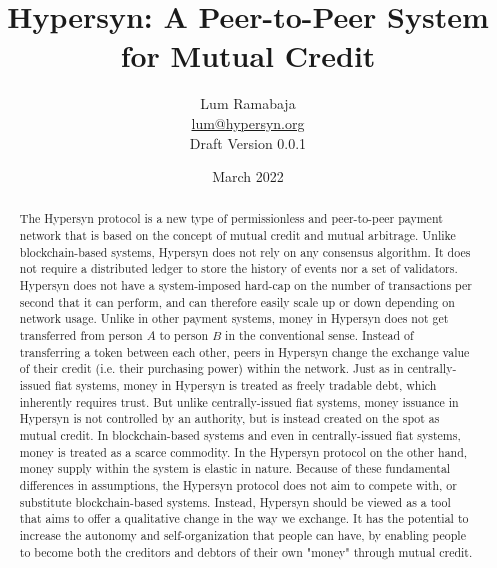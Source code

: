 \documentclass{article}
\title{Hypersyn: A Peer-to-Peer System for Mutual Credit}
\author{Lum Ramabaja \\ \href{mailto:lum@hypersyn.org}{lum@hypersyn.org} \\ Draft Version 0.0.1 }%
\date{March 2022}
\begin{document}
\maketitle

\begin{abstract}
    The Hypersyn protocol is a new type of permissionless and peer-to-peer payment network that is based on the concept of mutual credit and mutual arbitrage. Unlike blockchain-based systems, Hypersyn does not rely on any consensus algorithm. It does not require a distributed ledger to store the history of events nor a set of validators. Hypersyn does not have a system-imposed hard-cap on the number of transactions per second that it can perform, and can therefore easily scale up or down depending on network usage. Unlike in other payment systems, money in Hypersyn does not get transferred from person $A$ to person $B$ in the conventional sense. Instead of transferring a token between each other, peers in Hypersyn change the exchange value of their credit (i.e. their purchasing power) within the network. Just as in centrally-issued fiat systems, money in Hypersyn is treated as freely tradable debt, which inherently requires trust. But unlike centrally-issued fiat systems, money issuance in Hypersyn is not controlled by an authority, but is instead created on the spot as mutual credit. In blockchain-based systems and even in centrally-issued fiat systems, money is treated as a scarce commodity. In the Hypersyn protocol on the other hand, money supply within the system is elastic in nature. Because of these fundamental differences in assumptions, the Hypersyn protocol does not aim to compete with, or substitute blockchain-based systems. Instead, Hypersyn should be viewed as a tool that aims to offer a qualitative change in the way we exchange. It has the potential to increase the autonomy and self-organization that people can have, by enabling people to become both the creditors and debtors of their own "money" through mutual credit.
\end{abstract}


\end{document}
